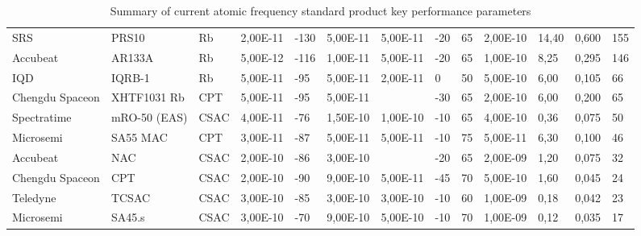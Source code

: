 \begin{table}
\begin{tabular}{ll|lllllllllll}
        SRS             & PRS10            & Rb            & 2,00E-11      & -130       & 5,00E-11       & 5,00E-11         & -20           & 65            & 2,00E-10        & 14,40          & 0,600           & 155           \\
        Accubeat        & AR133A           & Rb            & 5,00E-12      & -116       & 1,00E-11       & 5,00E-11         & -20           & 65            & 1,00E-10        & 8,25           & 0,295           & 146           \\
        IQD             & IQRB-1           & Rb            & 5,00E-11      & -95        & 5,00E-11       & 2,00E-11         & 0             & 50            & 5,00E-10        & 6,00           & 0,105           & 66            \\
        Chengdu Spaceon & XHTF1031 Rb      & CPT           & 5,00E-11      & -95        & 5,00E-11       & ~                & -30           & 65            & 2,00E-10        & 6,00           & 0,200           & 65            \\
        Spectratime     & mRO-50 (EAS)     & CSAC          & 4,00E-11      & -76        & 1,50E-10       & 1,00E-10         & -10           & 65            & 4,00E-10        & 0,36           & 0,075           & 50            \\
        Microsemi       & SA55 MAC         & CPT           & 3,00E-11      & -87        & 5,00E-11       & 5,00E-11         & -10           & 75            & 5,00E-11        & 6,30           & 0,100           & 46            \\
        Accubeat        & NAC              & CSAC          & 2,00E-10      & -86        & 3,00E-10       & ~                & -20           & 65            & 2,00E-09        & 1,20           & 0,075           & 32            \\
        Chengdu Spaceon & CPT              & CSAC          & 2,00E-10      & -90        & 9,00E-10       & 5,00E-11         & -45           & 70            & 5,00E-10        & 1,60           & 0,045           & 24            \\
        Teledyne        & TCSAC            & CSAC          & 3,00E-10      & -85        & 3,00E-10       & 3,00E-10         & -10           & 60            & 1,00E-09        & 0,18           & 0,042           & 23            \\
        Microsemi       & SA45.s           & CSAC          & 3,00E-10      & -70        & 9,00E-10       & 5,00E-10         & -10           & 70            & 1,00E-09        & 0,12           & 0,035           & 17            \\
        \hline
    \end{tabular}
    \caption{Summary of current atomic frequency standard product key performance parameters}
\end{table}
